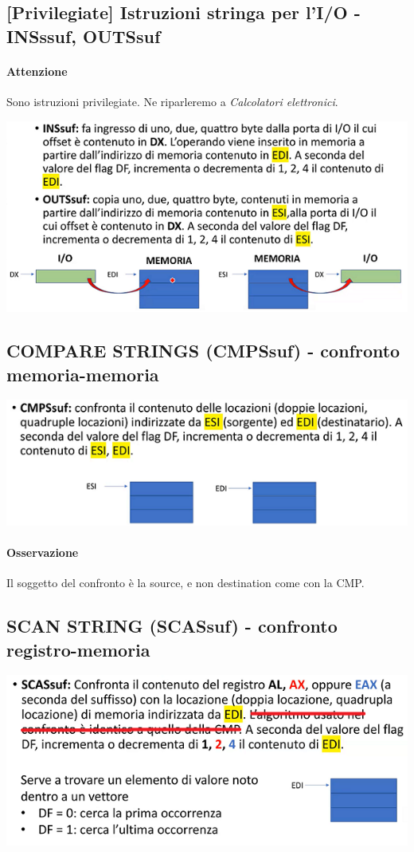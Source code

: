 \documentclass[11pt]{report}
\begin{document}
\subsection{[Privilegiate] Istruzioni stringa per l'I/O - INSssuf, OUTSsuf}
\paragraph{Attenzione} Sono istruzioni privilegiate. Ne riparleremo a \emph{Calcolatori elettronici}.
\begin{center}
\includegraphics{img/61.PNG}
\end{center}

\subsection{COMPARE STRINGS (CMPSsuf) - confronto memoria-memoria}
\begin{center}
\includegraphics{img/62.PNG}
\end{center}
\paragraph{Osservazione} Il soggetto del confronto è la source, e non destination come con la CMP.

\subsection{SCAN STRING (SCASsuf) - confronto registro-memoria}
\begin{center}
\includegraphics{img/63.PNG}
\end{center}
\end{document}
